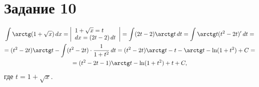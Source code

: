 \section{Задание 10}
\begin{multline*}
    \int \arctg(1+\sqrt{x}) \, dx = \left|\begin{array}{l}
                                            1+\sqrt{x} = t \\
                                            dx = (2t-2)\,dt
                                          \end{array}\right| = 
    \int (2t-2)\arctg t \, dt = \int \arctg t (t^2-2t)' \, dt = \\
    = (t^2-2t)\arctg t - \int (t^2-2t) \cdot \frac{1}{1+t^2} \, dt = 
    (t^2-2t)\arctg t - t - \arctg t - \ln (1+t^2) + C =\\ = (t^2-2t-1)\arctg t - 
    \ln (1+t^2) + t + C,
\end{multline*}
где $ t = 1+\sqrt{x} $.
